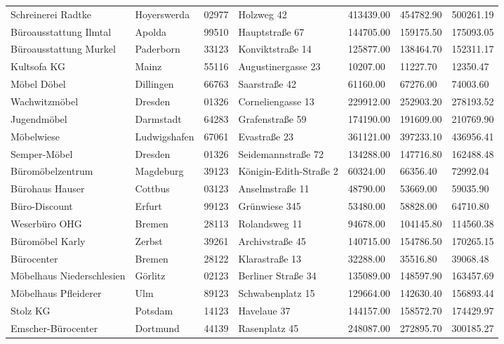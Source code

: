 {\begin{longtable}{lllllll}
        Schreinerei Radtke & Hoyerswerda & 02977 & Holzweg 42 & 413439.00 & 454782.90 & 500261.19 \\ 
        Büroausstattung Ilmtal & Apolda & 99510 & Hauptstraße 67 & 144705.00 & 159175.50 & 175093.05 \\ 
        Büroausstattung Murkel & Paderborn & 33123 & Konviktstraße 14 & 125877.00 & 138464.70 & 152311.17 \\ 
        Kultsofa KG & Mainz & 55116 & Augustinergasse 23 & 10207.00 & 11227.70 & 12350.47 \\
        Möbel Döbel & Dillingen & 66763 & Saarstraße 42 & 61160.00 & 67276.00 & 74003.60 \\
        Wachwitzmöbel & Dresden & 01326 & Corneliengasse 13 & 229912.00 & 252903.20 & 278193.52 \\
        Jugendmöbel & Darmstadt & 64283 & Grafenstraße 59 & 174190.00 & 191609.00 & 210769.90 \\
        Möbelwiese & Ludwigshafen & 67061 & Evastraße 23 & 361121.00 & 397233.10 & 436956.41 \\
        Semper-Möbel & Dresden & 01326 & Seidemannstraße 72 & 134288.00 & 147716.80 & 162488.48 \\
        Büromöbelzentrum & Magdeburg & 39123 & Königin-Edith-Straße 2 & 60324.00 & 66356.40 & 72992.04 \\
        Bürohaus Hauser & Cottbus & 03123 & Anselmstraße 11 & 48790.00 & 53669.00 & 59035.90 \\
        Büro-Discount & Erfurt & 99123 & Grünwiese 345 & 53480.00 & 58828.00 & 64710.80 \\
        Weserbüro OHG & Bremen & 28113 & Rolandsweg 11 & 94678.00 & 104145.80 & 114560.38 \\
        Büromöbel Karly & Zerbst & 39261 & Archivstraße 45 & 140715.00 & 154786.50 & 170265.15 \\
        Bürocenter & Bremen & 28122 & Klarastraße 13 & 32288.00 & 35516.80 & 39068.48 \\
        Möbelhaus Niederschlesien & Görlitz & 02123 & Berliner Straße 34 & 135089.00 & 148597.90 & 163457.69 \\
        Möbelhaus Pfleiderer & Ulm & 89123 & Schwabenplatz 15 & 129664.00 & 142630.40 & 156893.44 \\
        Stolz KG & Potsdam & 14123 & Havelaue 37 & 144157.00 & 158572.70 & 174429.97 \\
        Emscher-Bürocenter & Dortmund & 44139 & Rasenplatz 45 & 248087.00 & 272895.70 & 300185.27 \\

\end{longtable}}
